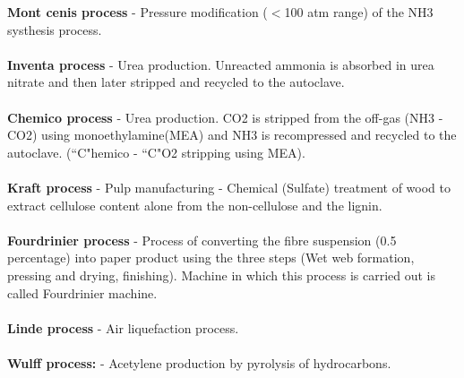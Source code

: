 \documentclass[12pt,a4paper]{article}
\begin{document}
\textbf{Mont cenis process} - Pressure modification ($<$100 atm range) of the NH3 systhesis process.\\ \\
\textbf{Inventa process} - Urea production. Unreacted ammonia is absorbed in urea nitrate and then later stripped and recycled to the autoclave.\\ \\ 
\textbf{Chemico process} - Urea production. CO2 is stripped from the off-gas (NH3 - CO2) using monoethylamine(MEA) and NH3 is recompressed and recycled to the autoclave. (``C"hemico - ``C"O2 stripping using MEA).\\ \\
\textbf{Kraft process} - Pulp manufacturing - Chemical (Sulfate) treatment of wood to extract cellulose content alone from the non-cellulose and the lignin.\\ \\
\textbf{Fourdrinier process} - Process of converting the fibre suspension (0.5 percentage) into paper product using the three steps (Wet web formation, pressing and drying, finishing). Machine in which this process is carried out is called Fourdrinier machine. \\ \\
\textbf{Linde process} - Air liquefaction process. \\ \\
\textbf{Wulff process:} - Acetylene production by pyrolysis of hydrocarbons.
\end{document}
